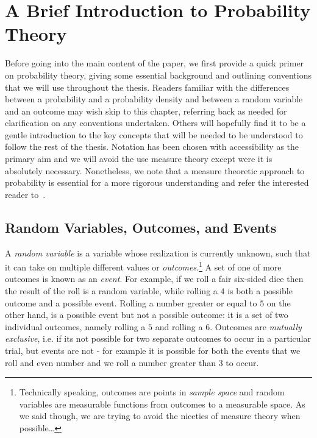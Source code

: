 
\chapter{A Brief Introduction to Probability Theory}
\label{chp:prob}

Before going into the main content of the paper, we first provide a quick primer on probability
theory, giving some essential background and outlining conventions
that we will use throughout the thesis.  Readers familiar with the differences between a probability
and a probability density and between a random variable and an outcome may wish skip to this
chapter, referring back as needed for clarification on any conventions undertaken.  Others
will hopefully find it to be a gentle introduction to the key concepts that will be needed to
be understood to follow the rest of the thesis.  Notation has been chosen with accessibility 
as the primary aim and we will avoid
the use measure theory except were it is absolutely necessary.  Nonetheless, we note that a measure theoretic
approach to probability is essential for a more rigorous understanding and refer
the interested reader to~\cite{durrett2010probability}.

\section{Random Variables, Outcomes, and Events}
\label{sec:prob:random}

A \emph{random variable} is a variable
whose realization is currently unknown, such that it can take on multiple different
values or \emph{outcomes}.\footnote{Technically speaking, outcomes are points in \emph{sample
		space} and random variables are measurable functions from outcomes to a measurable
	space.  As we said though, we are trying to avoid the niceties of measure theory when
	 possible\dots}
A set of one of more outcomes is known as an \emph{event}.
For example, if we roll a fair six-sided dice then the result of the roll is a random variable, 
while rolling a $4$ is both a possible outcome and a possible event.  Rolling a number greater
or equal to $5$ on the other hand, is a possible event but not a possible outcome: it is a set
of two individual outcomes, namely rolling a $5$ and rolling a $6$.  Outcomes are
\emph{mutually exclusive}, i.e. if its not possible for two separate outcomes to occur in a
particular trial, but events are not - for example it is possible for both the events that we
roll and even number and we roll a number greater than $3$ to occur.


